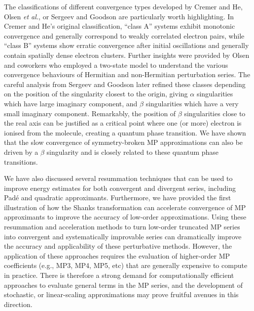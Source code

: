 \documentclass[aps,prb,reprint,noshowkeys,superscriptaddress]{revtex4-1}
\newcommand{\latin}[1]{#1}
\newcommand{\eg}{\latin{e.g.}}
\newcommand{\etal}{\textit{et al.}}
\begin{document}
The classifications of different convergence types developed by Cremer and He,\cite{Cremer_1996} 
Olsen \etal,\cite{Christiansen_1996,Olsen_1996,Olsen_2000,Olsen_2019} 
or Sergeev and Goodson\cite{Goodson_2000a,Goodson_2000b,Goodson_2004,Sergeev_2005,Sergeev_2006} are particularly
worth highlighting.
In Cremer and He's original classification, ``class A'' systems exhibit monotonic convergence and generally
correspond to weakly correlated electron pairs, while ``class B'' systems show erratic convergence after initial 
oscillations and generally contain spatially dense electron clusters.\cite{Cremer_1996}
Further insights were provided by Olsen and coworkers
who employed a two-state model to understand the various convergence behaviours of Hermitian and non-Hermitian 
perturbation series.\cite{Christiansen_1996,Olsen_1996,Olsen_2000,Olsen_2019}
The careful analysis from Sergeev and Goodson later refined these classes depending on the position of the
singularity closest to the origin, giving $\alpha$ singularities which have large imaginary component, 
and $\beta$ singularities which have a very small imaginary component.%
\cite{Goodson_2000a,Goodson_2000b,Goodson_2004,Sergeev_2005,Sergeev_2006}
Remarkably, the position of $\beta$ singularities close to the real axis can be justified as a critical 
point where one (or more) electron is ionised from the molecule, creating a quantum phase transition.\cite{Stillinger_2000}
We have shown that the slow convergence of symmetry-broken MP approximations can also be driven by a $\beta$ 
singularity and is closely related to these quantum phase transitions.

We have also discussed several resummation techniques that can be used to improve energy estimates
for both convergent and divergent series, including Pad\'e and quadratic approximants.
Furthermore, we have provided the first illustration of how the Shanks transformation can accelerate
convergence of MP approximants to improve the accuracy of low-order approximations.
Using these resummation and acceleration methods to turn low-order truncated MP series into convergent and
systematically improvable series can dramatically improve the accuracy and applicability of these perturbative methods.
However, the application of these approaches requires the evaluation of higher-order MP coefficients 
(\eg, MP3, MP4, MP5, etc) that are generally expensive to compute in practice.
There is therefore a strong demand for computationally efficient approaches to evaluate general terms in the MP 
series, and the development of stochastic,\cite{Thom_2007,Neuhauser_2012,Willow_2012,Takeshita_2017,Li_2019}
or linear-scaling approximations\cite{Rauhut_1998,Schutz_1999}
may prove fruitful avenues in this direction.
\end{document}
